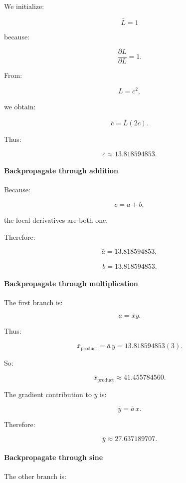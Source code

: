 We initialize:

\[
\boxed{\bar L=1}
\]

because:

\[
\frac{\partial L}{\partial L}=1.
\]

From:

\[
L=c^2,
\]

we obtain:

\[
\bar c=\bar L(2c).
\]

Thus:

\[
\boxed{\bar c\approx13.818594853}.
\]

\paragraph{Backpropagate through addition}\label{02-foundations-ii-ch022-backpropagate-through-addition}

Because:

\[
c=a+b,
\]

the local derivatives are both one.

Therefore:

\[
\boxed{\bar a=13.818594853},
\]

\[
\boxed{\bar b=13.818594853}.
\]

\paragraph{Backpropagate through multiplication}\label{02-foundations-ii-ch022-backpropagate-through-multiplication}

The first branch is:

\[
a=xy.
\]

Thus:

\[
\bar x_{\text{product}} = \bar a\,y = 13.818594853(3).
\]

So:

\[
\bar x_{\text{product}} \approx41.455784560.
\]

The gradient contribution to \(y\) is:

\[
\bar y=\bar a\,x.
\]

Therefore:

\[
\boxed{\bar y\approx27.637189707}.
\]

\paragraph{Backpropagate through sine}\label{02-foundations-ii-ch022-backpropagate-through-sine}

The other branch is:


